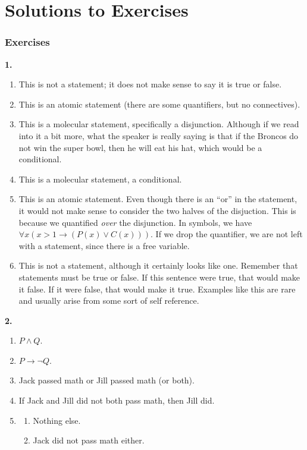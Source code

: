 \documentclass[10pt,]{memoir}
\theoremstyle{plain}
\theoremstyle{definition}
\theoremstyle{definition}
\theoremstyle{definition}
\numberwithin{equation}{chapter}
\def\imp{\rightarrow}
\begin{document}
\chapter[Solutions to Exercises]{Solutions to Exercises}\label{appendix-1}
\subsection*{ Exercises}
\noindent\textbf{1.}\quad{}\leavevmode%
\begin{enumerate}[label=(\alph*)]
\item\hypertarget{li-67}{}This is not a statement; it does not make sense to say it is true or false.\item\hypertarget{li-68}{}This is an atomic statement (there are some quantifiers, but no connectives).\item\hypertarget{li-69}{}This is a molecular statement, specifically a disjunction.  Although if we read into it a bit more, what the speaker is really saying is that if the Broncos do not win the super bowl, then he will eat his hat, which would be a conditional.\item\hypertarget{li-70}{}This is a molecular statement, a conditional.\item\hypertarget{li-71}{}This is an atomic statement.  Even though there is an ``or'' in the statement, it would not make sense to consider the two halves of the disjuction.  This is because we quantified \emph{over} the disjunction.  In symbols, we have \(\forall x (x > 1 \imp (P(x) \vee C(x)))\).  If we drop the quantifier, we are not left with a statement, since there is a free variable.\item\hypertarget{li-72}{}This is not a statement, although it certainly looks like one.  Remember that statements must be true or false.  If this sentence were true, that would make it false.  If it were false, that would make it true.  Examples like this are rare and usually arise from some sort of self reference.\end{enumerate}
\par\smallskip
\noindent\textbf{2.}\quad{}\leavevmode%
\begin{enumerate}[label=(\alph*)]
\item\hypertarget{li-80}{}\(P \wedge Q\).\item\hypertarget{li-81}{}\(P \imp \neg Q\).\item\hypertarget{li-82}{}
    Jack passed math or Jill passed math (or both).
\item\hypertarget{li-83}{}
    If Jack and Jill did not both pass math, then Jill did.
\item\hypertarget{li-84}{}
    \begin{enumerate}[label=\roman*.]
\item\hypertarget{li-85}{} Nothing else. \item\hypertarget{li-86}{} Jack did not pass math either.\end{enumerate}

\end{enumerate}
\end{document}
